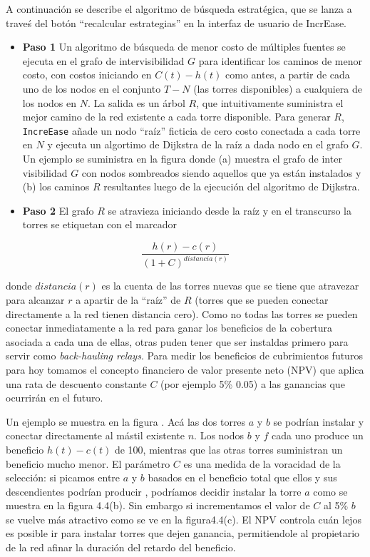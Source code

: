 \documentclass[]{article}
\begin{document}
A continuación se describe el algoritmo de búsqueda estratégica, que se
lanza a traveś del botón ``recalcular estrategias'' en la interfaz de
usuario de IncrEase.

\begin{itemize}
\item
  \textbf{Paso 1} Un algoritmo de búsqueda de menor costo de múltiples
  fuentes se ejecuta en el grafo de intervisibilidad \(G\) para
  identificar los caminos de menor costo, con costos iniciando en
  \(C(t) -h(t)\) como antes, a partir de cada uno de los nodos en el
  conjunto \(T-N\) (las torres disponibles) a cualquiera de los nodos en
  \(N\). La salida es un árbol \(R\), que intuitivamente suministra el
  mejor camino de la red existente a cada torre disponible. Para generar
  \(R\), \texttt{IncreEase} añade un nodo ``raíz'' ficticia de cero
  costo conectada a cada torre en \(N\) y ejecuta un algortimo de
  Dijkstra de la raíz a dada nodo en el grafo \(G\). Un ejemplo se
  suministra en la figura donde (a) muestra el grafo de inter
  visibilidad \(G\) con nodos sombreados siendo aquellos que ya están
  instalados y (b) los caminos \(R\) resultantes luego de la ejecución
  del algoritmo de Dijkstra.
\item
  \textbf{Paso 2} El grafo \(R\) se atravieza iniciando desde la raíz y
  en el transcurso la torres se etiquetan con el marcador
\end{itemize}

\[ \frac{h(r) - c(r)}{(1+C)^{distancia(r)}} \]

donde \(distancia(r)\) es la cuenta de las torres nuevas que se tiene
que atravezar para alcanzar \(r\) a apartir de la ``raíz'' de \(R\)
(torres que se pueden conectar directamente a la red tienen distancia
cero). Como no todas las torres se pueden conectar inmediatamente a la
red para ganar los beneficios de la cobertura asociada a cada una de
ellas, otras puden tener que ser instaldas primero para servir como
\emph{back-hauling relays}. Para medir los beneficios de cubrimientos
futuros para hoy tomamos el concepto financiero de valor presente neto
(NPV) que aplica una rata de descuento constante \(C\) (por ejemplo 5\%
0.05) a las ganancias que ocurrirán en el futuro.

Un ejemplo se muestra en la figura . Acá las dos torres \(a\) y \(b\) se
podrían instalar y conectar directamente al mástil existente \(n\). Los
nodos \(b\) y \(f\) cada uno produce un beneficio \(h(t) - c(t)\) de
100, mientras que las otras torres suministran un beneficio mucho menor.
El parámetro \(C\) es una medida de la voracidad de la selección: si
picamos entre \(a\) y \(b\) basados en el beneficio total que ellos y
sus descendientes podrían producir , podríamos decidir instalar la torre
\(a\) como se muestra en la figura 4.4(b). Sin embargo si incrementamos
el valor de \(C\) al 5\% \(b\) se vuelve más atractivo como se ve en la
figura4.4(c). El NPV controla cuán lejos es posible ir para instalar
torres que dejen ganancia, permitiendole al propietario de la red afinar
la duración del retardo del beneficio.
\end{document}
